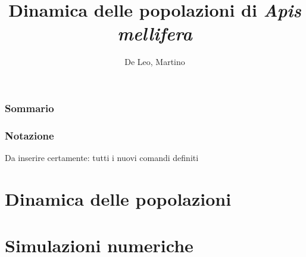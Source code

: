 \documentclass[12pt,a4paper,oneside,hidelinks]{book} %
\author{De Leo, Martino}
\title{Dinamica delle popolazioni di \emph{Apis mellifera} }
\begin{document}
\maketitle %

\frontmatter

\section*{Sommario}


\section*{Notazione}
Da inserire certamente: tutti i nuovi comandi definiti

\cleardoublepage

\tableofcontents

\listoffigures
\listoftables


\mainmatter

\clearpage
\part{Dinamica delle popolazioni}







\part{Simulazioni numeriche}










\appendix




\backmatter

\cleardoublepage
{}
\nocite{*} %
\printbibliography
\end{document}
